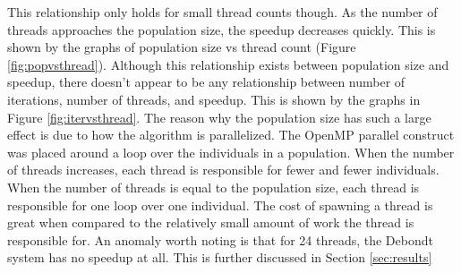 \documentclass[10pt,letterpaper]{article}
\begin{document}
This relationship only holds for small thread counts though. As the number of threads approaches the population size, the speedup decreases quickly. This is shown by the graphs of population size vs thread count (Figure \ref{fig:popvsthread}). Although this relationship exists between population size and speedup, there doesn't appear to be any relationship between number of iterations, number of threads, and speedup. This is shown by the graphs in Figure \ref{fig:itervsthread}. The reason why the population size has such a large effect is due to how the algorithm is parallelized. The OpenMP parallel construct was placed around a loop over the individuals in a population. When the number of threads increases, each thread is responsible for fewer and fewer individuals. When the number of threads is equal to the population size, each thread is responsible for one loop over one individual. The cost of spawning a thread is great when compared to the relatively small amount of work the thread is responsible for. An anomaly worth noting is that for 24 threads, the Debondt system has no speedup at all. This is further discussed in Section \ref{sec:results}
\end{document}
